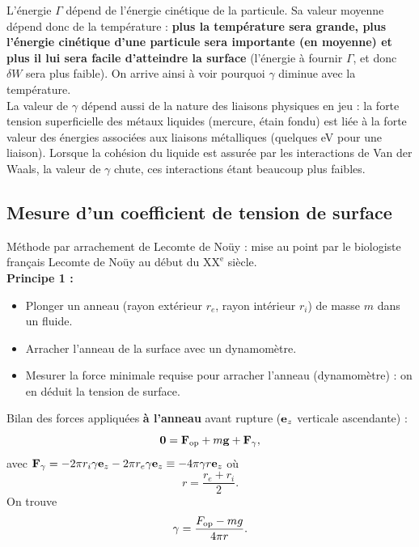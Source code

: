 \documentclass[11pt,a4paper]{report}
\begin{document}
L'énergie $\Gamma$ dépend de l'énergie cinétique de la particule. Sa valeur moyenne dépend donc de la température : \textbf{plus la température sera grande, plus l'énergie cinétique d'une particule sera importante (en moyenne) et plus il lui sera facile d'atteindre la surface} (l'énergie à fournir $\Gamma$, et donc $\delta W$ sera plus faible). On arrive ainsi à voir pourquoi $\gamma$ diminue avec la température.\\

La valeur de $\gamma$ dépend aussi de la nature des liaisons physiques en jeu : la forte tension superficielle des métaux liquides (mercure, étain fondu) est liée à la forte valeur des énergies associées aux liaisons métalliques (quelques eV pour une liaison). Lorsque la cohésion du liquide est assurée par les interactions de Van der Waals, la valeur de $\gamma$ chute, ces interactions étant beaucoup plus faibles.
 
\subsection{Mesure d'un coefficient de tension de surface}

Méthode par arrachement de Lecomte de Noüy : mise au point par le biologiste français Lecomte de Noüy au début du $\text{XX}^\text{e}$ siècle.\\

\textbf{Principe 1 :}
\begin{itemize}
	\item Plonger un anneau (rayon extérieur $r_e$, rayon intérieur $r_i$) de masse $m$ dans un fluide.
	\item Arracher l'anneau de la surface avec un dynamomètre.
	\item Mesurer la force minimale requise pour arracher l'anneau (dynamomètre) : on en déduit la tension de surface.
\end{itemize}

Bilan des forces appliquées \textbf{à l'anneau} avant rupture ($\bold{e}_z$ verticale ascendante) :
\begin{equation}
	\bold{0} = \bold{F}_\text{op} + m\bold{g} + \bold{F}_\gamma,
\end{equation}
avec $\bold{F}_\gamma = -2\pi r_i \gamma \bold{e}_z - 2\pi r_e \gamma \bold{e}_z \equiv - 4\pi\gamma r \bold{e}_z$ où
\begin{equation}
	r = \frac{r_e + r_i}{2}.
\end{equation}
On trouve
\begin{equation}
	\gamma = \frac{F_\text{op} - mg}{4\pi r}.\\
\end{equation}
\end{document}

